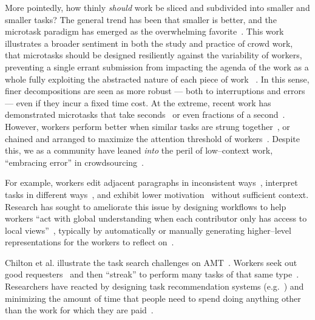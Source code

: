 \documentclass[pn4226]{subfiles}
\begin{document}
More pointedly,
how thinly \textit{should} work be sliced and subdivided into smaller and smaller tasks? 
The general trend has been that smaller is better,
and the microtask paradigm has emerged as the overwhelming favorite~\cite{selfsourcingTeevan2014,selfsourcingTeevan2016}.
This work illustrates a broader sentiment in both the study and practice
of crowd work,
that microtasks should be designed resiliently against the variability of workers,
preventing a single errant submission from impacting the agenda of the work as a whole %
fully exploiting the abstracted nature of each piece of work
~\cite{interruptionIqbal,delayAndOrderLasecki,vaish2014low}.
In this sense,
finer decompositions are seen as more robust
--- both to interruptions and errors~\cite{cheng2015break} ---
even if they incur a fixed time cost.
At the extreme,
recent work has demonstrated
microtasks that take seconds~\cite{Vaish:2014:TCC:2611222.2556996,Cai:2015:WLW:2702123.2702267}
or even fractions of a second~\cite{embracingErrorKrishna}.
However,
workers perform better when similar tasks are strung together~\cite{delayAndOrderLasecki},
or
chained and arranged to maximize the attention threshold of workers~\cite{Cai:2016:CRI:2858036.2858237}.
Despite this,
we as a community have leaned \textit{into} the peril of
low--context work, ``embracing error'' in crowdsourcing~\cite{embracingErrorKrishna}.


For example,
workers edit adjacent paragraphs in inconsistent ways~\cite{bernsteinSoylent,Kim2017},
interpret tasks in different ways~\cite{kairam2016parting},
and exhibit lower motivation~\cite{Kinnaird:2012:WTM:2389176.2389219} without sufficient context.
Research has sought to ameliorate this issue by
designing workflows to help workers ``act with global understanding when
each contributor only has access to local views''~\cite{verroios2014context},
typically by automatically or manually generating higher--level representations
for the workers to reflect on~\cite{chilton2013cascade,verroios2014context,Kim2017}.

Chilton et al. illustrate the task search challenges on AMT~\cite{taskSearch}.
Workers seek out good requesters~\cite{martin2014being} and then 
``streak'' to perform many tasks of that same type~\cite{taskSearch}.
Researchers have reacted by designing task recommendation systems (e.g.~\cite{Cosley:2007:SUI:1216295.1216309})
and minimizing the amount of time that people need to spend doing anything other than
the work for which they are paid~\cite{callison2014crowd}.
\end{document}
